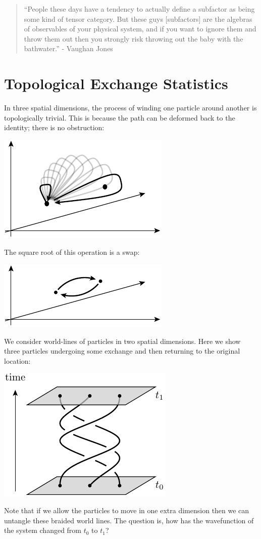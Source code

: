 \documentclass[aps, prl, letterpaper, twocolumn, superscriptaddress, notitlepage, 10pt]{revtex4-1}
\begin{document}
\begin{quotation}
``People these days have a tendency 
to actually define a subfactor as being some kind of
tensor category.
But these guys [subfactors] are the algebras of observables
of your physical system, and if you want to
ignore them and throw them out then you strongly
risk throwing out the baby with the bathwater.''
- Vaughan Jones~\cite{Jones2015}
\end{quotation}

\section{Topological Exchange Statistics}

In three spatial dimensions, the process of winding one
particle around another is topologically trivial.
This is because the path can be deformed back to the
identity; there is no obstruction:
\begin{center}
\includegraphics[]{pic-monodromy3d.pdf}
\end{center}
The square root of this operation is a swap:
\begin{center}
\includegraphics[]{pic-swap.pdf}
\end{center}

We consider world-lines of particles in two spatial dimensions.
Here we show three particles undergoing some exchange and then
returning to the original location:
\begin{center}
\includegraphics[]{pic-braid-worldlines.pdf}
\end{center}
Note that if we allow the particles to move in one extra
dimension then we can untangle these braided world lines.
The question is, how has the wavefunction of the system
changed from $t_0$ to $t_1$?
\end{document}
